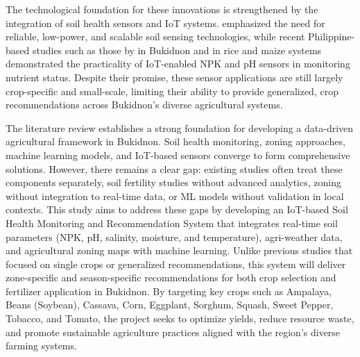 {	The technological foundation for these innovations is strengthened by the integration of soil health sensors and IoT systems. \cite{Yin2021} emphasized the need for reliable, low-power, and scalable soil sensing technologies, while recent Philippine-based studies such as those by \cite{Sondhiya2024} in Bukidnon and \cite{KumarR2024} in rice and maize systems demonstrated the practicality of IoT-enabled NPK and pH sensors in monitoring nutrient status. Despite their promise, these sensor applications are still largely crop-specific and small-scale, limiting their ability to provide generalized, crop recommendations across Bukidnon’s diverse agricultural systems.
	
	The literature review establishes a strong foundation for developing a data-driven agricultural framework in Bukidnon. Soil health monitoring, zoning approaches, machine learning models, and IoT-based sensors converge to form comprehensive solutions. However, there remains a clear gap: existing studies often treat these components separately, soil fertility studies without advanced analytics, zoning without integration to real-time data, or ML models without validation in local contexts. This study aims to address these gaps by developing an IoT-based Soil Health Monitoring and Recommendation System that integrates real-time soil parameters (NPK, pH, salinity, moisture, and temperature), agri-weather data, and agricultural zoning maps with machine learning. Unlike previous studies that focused on single crops or generalized recommendations, this system will deliver zone-specific and season-specific recommendations for both crop selection and fertilizer application in Bukidnon. By targeting key crops such as Ampalaya, Beans (Soybean), Cassava, Corn,
	Eggplant, Sorghum, Squash, Sweet Pepper, Tobacco, and Tomato, the project seeks to optimize yields, reduce resource waste, and promote sustainable agriculture practices aligned with the region’s diverse farming systems.
	
}